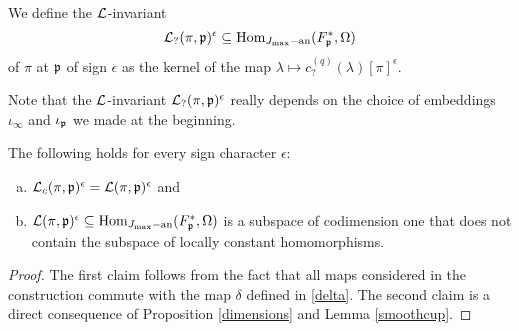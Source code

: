 \begin{Def}
We define the $\mathcal{L}$-invariant
$$\mathcal{L}_?(\pi,\mathfrak{p})^{\epsilon}\subseteq \operatorname{Hom}_{{J_{\operatorname{max}}-\operatorname{an}}}(F_{\mathfrak{p}}^{\ast},\Omega)$$ of $\pi$ at $\mathfrak{p}$ of sign $\epsilon$ as the kernel of the map $\lambda \mapsto c^{(q)}_?(\lambda)[\pi]^{\epsilon}.$
\end{Def}
Note that the $\mathcal{L}$-invariant $\mathcal{L}_?(\pi,\mathfrak{p})^{\epsilon}$ really depends on the choice of embeddings $\iota_\infty$ and $\iota_{\mathfrak{p}}$ we made at the beginning.
\begin{Pro}
The following holds for every sign character $\epsilon$:
\begin{enumerate}[(a)]
\item $\mathcal{L}_c(\pi,\mathfrak{p})^{\epsilon}=\mathcal{L}(\pi,\mathfrak{p})^{\epsilon}$ and
\item $\mathcal{L}(\pi,\mathfrak{p})^{\epsilon}\subseteq \operatorname{Hom}_{J_{\operatorname{max}}-\operatorname{an}}(F_{\mathfrak{p}}^{\ast},\Omega)$ is a subspace of codimension one that does not contain the subspace of locally constant homomorphisms.
\end{enumerate}
\end{Pro}
\begin{proof}
The first claim follows from the fact that all maps considered in the construction commute with the map $\delta$ defined in \eqref{delta}.
The second claim is a direct consequence of Proposition \ref{dimensions} and Lemma \ref{smoothcup}.
\end{proof}

